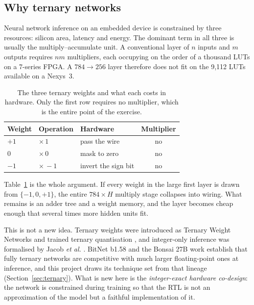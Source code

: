 \documentclass[11pt,a4paper]{article}
\begin{document}
\subsection{Why ternary networks}

Neural network inference on an embedded device is constrained by three
resources: silicon area, latency and energy. The dominant term in all three is
usually the multiply--accumulate unit. A conventional layer of $n$ inputs and
$m$ outputs requires $nm$ multipliers, each occupying on the order of a thousand
LUTs on a 7-series FPGA. A $784 \rightarrow 256$ layer therefore does not fit
on the 9{,}112 LUTs available on a Nexys~3.

\begin{table}[H]
\centering
\small
\caption{The three ternary weights and what each costs in hardware. Only the
  first row requires no multiplier, which is the entire point of the exercise.}
\label{tab:ternary-ops}
\begin{tabular}{@{}lllc@{}}
\toprule
\textbf{Weight} & \textbf{Operation} & \textbf{Hardware} & \textbf{Multiplier} \\
\midrule
$+1$ & $\times\,1$ & pass the wire       & no \\
$0$  & $\times\,0$ & mask to zero        & no \\
$-1$ & $\times\,-1$ & invert the sign bit & no \\
\bottomrule
\end{tabular}
\end{table}

Table~\ref{tab:ternary-ops} is the whole argument. If every weight in the large
first layer is drawn from $\{-1,0,+1\}$, the entire $784 \times H$ multiply stage
collapses into wiring. What remains is an adder tree and a weight memory, and the
layer becomes cheap enough that several times more hidden units fit.

This is not a new idea. Ternary weights were introduced as Ternary Weight
Networks \cite{li2016ternary} and trained ternary quantisation
\cite{zhu2017trained}, and integer-only inference was formalised by Jacob
\emph{et al.} \cite{jacob2018quant}. BitNet b1.58 and the Bonsai 27B work establish that
fully ternary networks are competitive with much larger floating-point ones at
inference, and this project draws its technique set from that lineage
(Section~\ref{sec:ternary}). What is new here is the \emph{integer-exact
hardware co-design}: the network is constrained during training so that the RTL
is not an approximation of the model but a faithful implementation of it.
\end{document}
